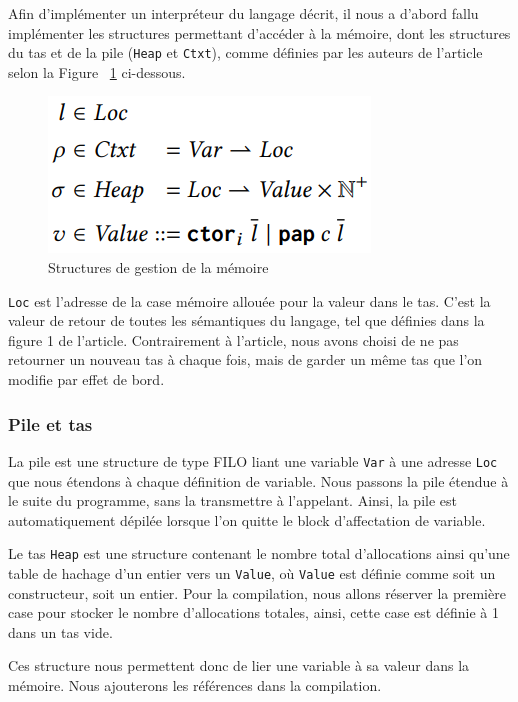 \documentclass{rapportECL}
\begin{document}
Afin d'implémenter un interpréteur du langage décrit, il nous a d'abord fallu implémenter les structures permettant d'accéder à la mémoire, dont les structures du tas et de la pile (\verb|Heap| et \verb|Ctxt|), comme définies par les auteurs de l'article selon la Figure ~\ref{fig:memory} ci-dessous.

\begin{figure}[hbt!]
	\centering
	\includegraphics[scale=0.80]{logos/figure_strutures_interpreteur.png}
	\caption{Structures de gestion de la mémoire} 
	\label{fig:memory}
\end{figure}
\FloatBarrier 


\verb|Loc| est l'adresse de la case mémoire allouée pour la valeur dans le tas. C'est la valeur de retour de toutes les sémantiques 
du langage, tel que définies dans la figure 1 de l'article\cite{ullrich_counting_2020}.
Contrairement à l'article, nous avons choisi de ne pas retourner un nouveau tas à chaque fois, mais de garder un même tas que 
l'on modifie par effet de bord.


\subsubsection{Pile et tas}

La pile est une structure de type FILO liant une variable \verb|Var| à une adresse \verb|Loc| que nous étendons à chaque définition de variable. Nous passons la pile étendue à le suite du programme, sans la transmettre à l'appelant. Ainsi, la pile est automatiquement dépilée lorsque l'on quitte le block d'affectation de variable.

Le tas \verb|Heap| est une structure contenant le nombre total d'allocations ainsi qu'une table de hachage d'un entier vers un \verb|Value|, où \verb|Value| est définie comme soit un constructeur, soit un entier.
Pour la compilation, nous allons réserver la première case pour stocker le nombre d'allocations totales, ainsi, cette case est définie à 1 dans un tas vide.

Ces structure nous permettent donc de lier une variable à sa valeur dans la mémoire. Nous ajouterons les références dans la compilation.
\end{document}
